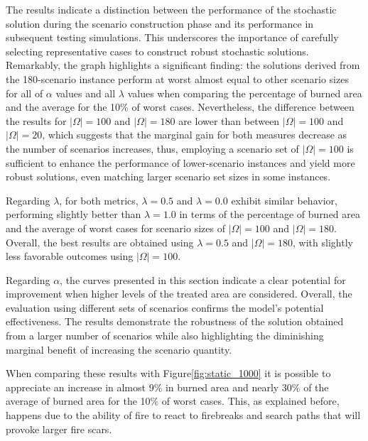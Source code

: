 \documentclass[a4paper,fleqn]{cas-sc}
\begin{document}
The results indicate a distinction between the performance of the stochastic solution during the scenario construction phase and its performance in subsequent testing simulations. This underscores the importance of carefully selecting representative cases to construct robust stochastic solutions. Remarkably, the graph highlights a significant finding: the solutions derived from the 180-scenario instance perform at worst almost equal to other scenario sizes for all of $\alpha$ values and all $\lambda $ values when comparing the percentage of burned area and the average for the 10\% of worst cases. Nevertheless, the difference between the results for $|\Omega| = 100$ and $|\Omega| = 180$ are lower than between  $|\Omega| = 100$ and $|\Omega| = 20$, which suggests that the marginal gain for both measures decrease as the number of scenarios increases, thus, employing a scenario set of $|\Omega| = 100$ is sufficient to enhance the performance of lower-scenario instances and yield more robust solutions, even matching larger scenario set sizes in some instances.

Regarding $\lambda$, for both metrics, $\lambda = 0.5$ and $\lambda = 0.0$ exhibit similar behavior, performing slightly better than $\lambda = 1.0$ in terms of the percentage of burned area and the average of worst cases for scenario sizes of $|\Omega| = 100$ and $|\Omega| = 180$. Overall, the best results are obtained using $\lambda = 0.5$ and $|\Omega| = 180$, with slightly less favorable outcomes using $|\Omega| = 100$.

Regarding $\alpha$, the curves presented in this section indicate a clear potential for improvement when higher levels of the treated area are considered. Overall, the evaluation using different sets of scenarios confirms the model's potential effectiveness. The results demonstrate the robustness of the solution obtained from a larger number of scenarios while also highlighting the diminishing marginal benefit of increasing the scenario quantity.

When comparing these results with Figure\:\ref{fig:static_1000} it is possible to appreciate an increase in almost 9\% in burned area and nearly 30\% of the average of burned area for the 10\% of worst cases. This, as explained before, happens due to the ability of fire to react to firebreaks and search paths that will provoke larger fire scars.
\end{document}
